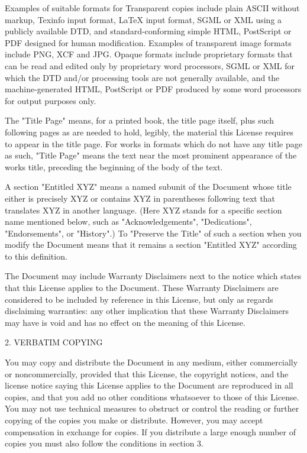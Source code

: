 \documentclass[
  english,
  11pt,
  a4paper,
]{article}
\begin{document}
Examples of suitable formats for Transparent copies include plain ASCII
without markup, Texinfo input format, LaTeX input format, SGML or XML
using a publicly available DTD, and standard-conforming simple HTML,
PostScript or PDF designed for human modification. Examples of
transparent image formats include PNG, XCF and JPG. Opaque formats
include proprietary formats that can be read and edited only by
proprietary word processors, SGML or XML for which the DTD and/or
processing tools are not generally available, and the machine-generated
HTML, PostScript or PDF produced by some word processors for output
purposes only.

The "Title Page" means, for a printed book, the title page itself, plus
such following pages as are needed to hold, legibly, the material this
License requires to appear in the title page. For works in formats which
do not have any title page as such, "Title Page" means the text near the
most prominent appearance of the work\textquotesingle s title, preceding
the beginning of the body of the text.

A section "Entitled XYZ" means a named subunit of the Document whose
title either is precisely XYZ or contains XYZ in parentheses following
text that translates XYZ in another language. (Here XYZ stands for a
specific section name mentioned below, such as "Acknowledgements",
"Dedications", "Endorsements", or "History".) To "Preserve the Title" of
such a section when you modify the Document means that it remains a
section "Entitled XYZ" according to this definition.

The Document may include Warranty Disclaimers next to the notice which
states that this License applies to the Document. These Warranty
Disclaimers are considered to be included by reference in this License,
but only as regards disclaiming warranties: any other implication that
these Warranty Disclaimers may have is void and has no effect on the
meaning of this License.

2. VERBATIM COPYING

You may copy and distribute the Document in any medium, either
commercially or noncommercially, provided that this License, the
copyright notices, and the license notice saying this License applies to
the Document are reproduced in all copies, and that you add no other
conditions whatsoever to those of this License. You may not use
technical measures to obstruct or control the reading or further copying
of the copies you make or distribute. However, you may accept
compensation in exchange for copies. If you distribute a large enough
number of copies you must also follow the conditions in section 3.
\end{document}

